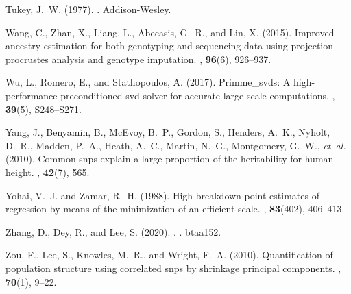 \documentclass{bioinfo}
\begin{document}
\begin{thebibliography}{}
	Tukey, J.~W. (1977).
	.
	\newblock Addison-Wesley.
	
	Wang, C., Zhan, X., Liang, L., Abecasis, G.~R., and Lin, X. (2015).
	\newblock Improved ancestry estimation for both genotyping and sequencing data
	using projection procrustes analysis and genotype imputation.
	, {\bf 96}(6),
	926--937.
	
	Wu, L., Romero, E., and Stathopoulos, A. (2017).
	\newblock Primme\_svds: A high-performance preconditioned svd solver for
	accurate large-scale computations.
	, {\bf 39}(5),
	S248--S271.
	
	Yang, J., Benyamin, B., McEvoy, B.~P., Gordon, S., Henders, A.~K., Nyholt,
	D.~R., Madden, P.~A., Heath, A.~C., Martin, N.~G., Montgomery, G.~W., {\em
		et~al.} (2010).
	\newblock Common snps explain a large proportion of the heritability for human
	height.
	, {\bf 42}(7), 565.
	
	Yohai, V.~J. and Zamar, R.~H. (1988).
	\newblock High breakdown-point estimates of regression by means of the
	minimization of an efficient scale.
	, {\bf
		83}(402), 406--413.
	
	Zhang, D., Dey, R., and Lee, S. (2020).
	.
	.
	\newblock btaa152.
	
	Zou, F., Lee, S., Knowles, M.~R., and Wright, F.~A. (2010).
	\newblock Quantification of population structure using correlated snps by
	shrinkage principal components.
	, {\bf 70}(1), 9--22.
	
\end{thebibliography}

\end{document}
